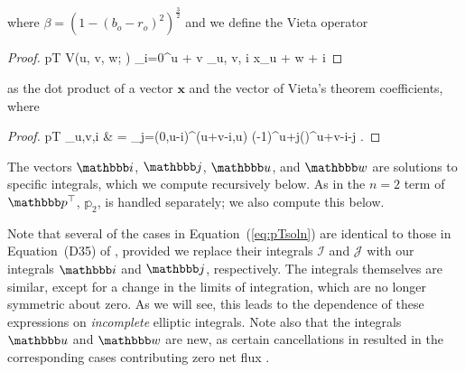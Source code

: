 \documentclass[modern]{aastex62}
\begin{document}
%
where $\beta = \left(1 - (b_o - r_o)^2\right)^\frac{3}{2}$
and we define the Vieta operator
%
\begin{proof}{pT}
    \label{eq:V}
    V\left(u, v, w; \right) \equiv
    \sum_{i=0}^{u + v}
    _{u, v, i}
    x_{u + w + i}
\end{proof}
%
as the dot product of a vector $\mathbf{x}$ and
the vector of Vieta's theorem coefficients, where
\citep[c.f. Equation~D34 in][]{Luger2019}
%
\begin{proof}{pT}
    \label{eq:vieta}
    _{u,v,i} & =
    \sum_{j=(0,u-i)}^{(u+v-i,u)}
    (-1)^{u+j}\left(\right)^{u+v-i-j}
    \quad.
\end{proof}
%
The vectors $\viI$, $\viJ$,
$\viU$, and $\viW$ are solutions
to specific integrals, which we compute recursively below. As in
\citet{Luger2019} the $n = 2$ term of $\pT$, $\mathbb{p}_2$,
is handled separately; we also compute this below.

Note that several of the cases in Equation~(\ref{eq:pTsoln}) are
identical to those in Equation~(D35) of \citet{Luger2019}, provided
we replace their integrals $\mathcal{I}$ and $\mathcal{J}$ with our
integrals $\viI$ and $\viJ$, respectively. The integrals themselves
are similar, except for a change in the limits of integration, which
are no longer symmetric about zero. As we will see, this leads to the
dependence of these expressions on \emph{incomplete} elliptic integrals.
Note also that the integrals $\viU$ and $\viW$ are new, as certain
cancellations in \citet{Luger2019} resulted in the corresponding cases
contributing zero net flux \citep[last case in Equation~D35 of][]{Luger2019}.

%
\end{document}
